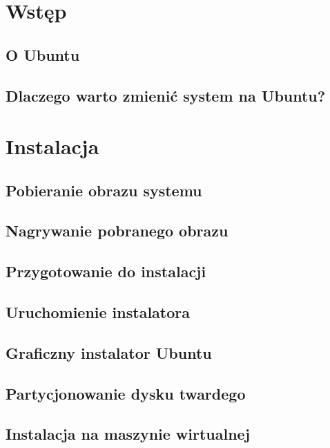 \documentclass[a4paper,11pt,oneside]{mwart}
\begin{document}


\section{Wstęp}
        
        \subsection{O Ubuntu}
                
        \subsection{Dlaczego warto zmienić system na Ubuntu?}
                
\section{Instalacja}
        \subsection{Pobieranie obrazu systemu}
                
        \subsection{Nagrywanie pobranego obrazu}
                
                
        \subsection{Przygotowanie do instalacji}
                
        \subsection{Uruchomienie instalatora}
                
        \subsection{Graficzny instalator Ubuntu}
                
        \subsection{Partycjonowanie dysku twardego}
                
        \subsection{Instalacja na maszynie wirtualnej}
                  
\end{document}
